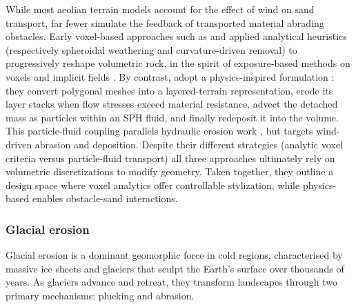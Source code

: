 While most aeolian terrain models account for the effect of wind on sand transport, far fewer simulate the feedback of transported material abrading obstacles. Early voxel-based approaches such as \cite{Beardall2007} and \cite{Jones2010} applied analytical heuristics (respectively spheroidal weathering and curvature-driven removal) to progressively reshape volumetric rock, in the spirit of exposure-based methods on voxels and implicit fields \cite{Paris2019a}. By contrast,  adopt a physics-inspired formulation \cite{Krs2020}: they convert polygonal meshes into a layered-terrain representation, erode its layer stacks when flow stresses exceed material resistance, advect the detached mass as particles within an SPH fluid, and finally redeposit it into the volume. This particle-fluid coupling parallels hydraulic erosion work \cite{Kristof2009}, but targets wind-driven abrasion and deposition. Despite their different strategies (analytic voxel criteria versus particle-fluid transport) all three approaches ultimately rely on volumetric discretizations to modify geometry. Taken together, they outline a design space where voxel analytics offer controllable stylization, while physics-based enables obstacle-sand interactions. %




\subsubsection{Glacial erosion}
Glacial erosion is a dominant geomorphic force in cold regions, characterised by massive ice sheets and glaciers that sculpt the Earth's surface over thousands of years. As glaciers advance and retreat, they transform landscapes through two primary mechanisms: plucking and abrasion.

